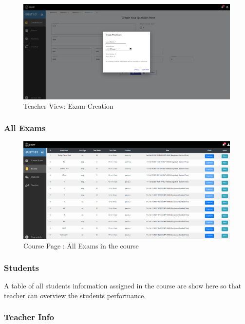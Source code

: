 \documentclass[10pt]{article}
\begin{document}
\begin{figure}[H]
  \centering
  \centerline{\includegraphics[width=\textwidth]{teacher/set-exam.png}}
  \caption{Teacher View: Exam Creation}
  \label{fig}
\end{figure}

\subsubsection{All Exams}


\begin{figure}[H]
  \centering
  \centerline{\includegraphics[width=\textwidth]{teacher/all-exams.png}}
  \caption{Course Page : All Exams in the course}
  \label{fig}
\end{figure}

\subsubsection{Students}

A table of all students information assigned in the course are show here so that teacher can overview the students performance.

\subsubsection{Teacher Info}
\end{document}
